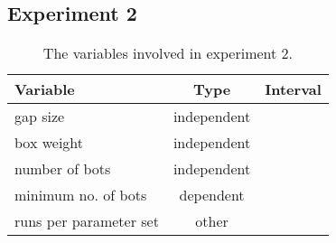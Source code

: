 \subsection{Experiment 2}
\label{ssec:exp2}

\begin{table}
 \caption{The variables involved in experiment 2.}
 \begin{center}
  \begin{tabular}{| p{5cm} | c | c |}
   \hline
   \centering \textbf{Variable} & \textbf{Type} & \textbf{Interval} \\ \hline
   gap size & independent & \\ \hline
   box weight & independent & \\ \hline
   number of bots & independent & \\ \hline
   minimum no. of bots & dependent &  \\ \hline
   runs per parameter set & other & \\ \hline
  \end{tabular}
 \end{center}
 \label{tbl:exp2}
\end{table}
